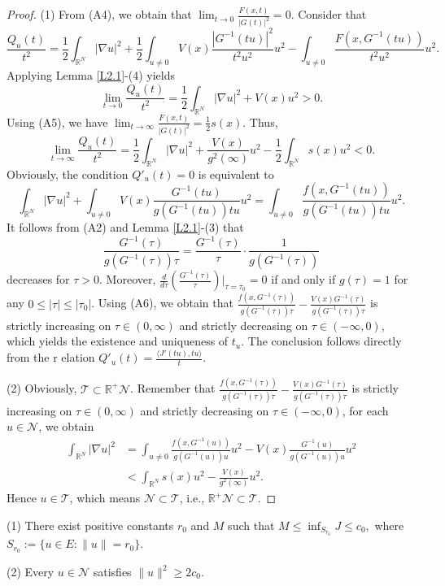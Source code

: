 \documentclass[reqno]{amsart}
\begin{document}
\begin{proof}
 (1) From (A4), we obtain that
$\lim_{t\to 0}\frac{F(x,t)}{|G(t)|^2}=0$.
Consider that
$$
\frac{Q_u(t)}{t^2}=\frac{1}{2}\int_{\mathbb{R}^N}|\nabla u|^2+\frac{1}{2}\int_{u\neq 0}V(x)\frac{|G^{-1}(tu)|^2}{t^2u^2}u^2-\int_{u\neq 0}\frac{F(x,G^{-1}(tu))}{t^2u^2}u^2.
$$
Applying Lemma \ref{L2.1}-(4) yields 
$$
\lim_{t\to 0}\frac{Q_u(t)}{t^2}=\frac{1}{2}\int_{\mathbb{R}^N}|\nabla u|^2+V(x)u^2>0.
$$
 Using (A5), we have
$\lim_{t\to\infty}\frac{F(x,t)}{|G(t)|^2}=\frac{1}{2}s(x)$. Thus,
$$
\lim_{t\to\infty}\frac{Q_u(t)}{t^2}= \frac{1}{2}\int_{\mathbb{R}^N}|\nabla u|^2
+\frac{V(x)}{g^2(\infty)}u^2-\frac{1}{2}\int_{\mathbb{R}^N}s(x)u^2<0.
$$
Obviously, the condition $Q'_u(t) = 0$ is equivalent to
$$
\int_{\mathbb{R}^N}|\nabla u|^2+\int_{u\neq 0}V(x)\frac{G^{-1}(tu)}{g(G^{-1}(tu))tu}u^2
=\int_{u\neq 0}\frac{f(x,G^{-1}(tu))}{g(G^{-1}(tu))tu}u^2.
$$
It follows from (A2) and Lemma \ref{L2.1}-(3) that 
$$
\frac{G^{-1}(\tau)}{g(G^{-1}(\tau))\tau}=\frac{G^{-1}(\tau)}{\tau}\cdot \frac{1}{g(G^{-1}(\tau))}
$$
decreases for $\tau > 0$. Moreover, $\frac{d}{d\tau}(\frac{G^{-1}(\tau)}{\tau})|_{\tau=\tau_0}=0$ 
if and only if $g(\tau)=1$ for any $0\leq |\tau|\leq |\tau_0|$. Using (A6), we obtain that 
$\frac{f(x,G^{-1}(\tau))}{g(G^{-1}(\tau))\tau}-\frac{V(x)G^{-1}(\tau)}{g(G^{-1}(\tau))\tau}$ 
is strictly increasing on $\tau\in(0,\infty)$ and strictly decreasing on $\tau\in(-\infty,0)$, 
which yields the existence and uniqueness of $t_u$. The conclusion follows directly from  the r
elation $Q'_u(t) = \frac{\langle J'(tu), tu \rangle}{t}$.
 
(2) Obviously, $\mathcal{T}\subset\mathbb{R}^+\mathcal{N}$. Remember that  
$\frac{f(x,G^{-1}(\tau))}{g(G^{-1}(\tau))\tau}-\frac{V(x)G^{-1}(\tau)}{g(G^{-1}(\tau))\tau}$ is strictly 
increasing on $\tau\in(0,\infty)$ and strictly decreasing on $\tau\in(-\infty,0)$, for each  \( u \in \mathcal{N} \), we obtain
\begin{align*}
\int_{\mathbb{R}^N}|\nabla u|^2 
&= \int_{u\neq 0}\frac{f(x,G^{-1}(u))}{g(G^{-1}(u))u}u^2-V(x)\frac{G^{-1}(u)}{g(G^{-1}(u))u}u^2\\
&< \int_{\mathbb{R}^N}s(x)u^2-\frac{V(x)}{g^2(\infty)}u^2.
\end{align*}
Hence $u\in\mathcal{T}$, which means $\mathcal{N}\subset\mathcal{T}$, i.e., 
$\mathbb{R}^+\mathcal{N}\subset\mathcal{T}$.
\end{proof}


\begin{lemma}\label{L3.3} 
(1) There exist positive constants $r_0$ and $M$ such that $M\leq \inf_{S_{r_0}}J\leq c_0,$ where $S_{r_0}:=\{u\in E:\|u\|=r_0\}$.

(2) Every $u\in \mathcal{N}$ satisfies $\|u\|^{2}\geq 2c_0$.
\end{lemma}
\end{document}
